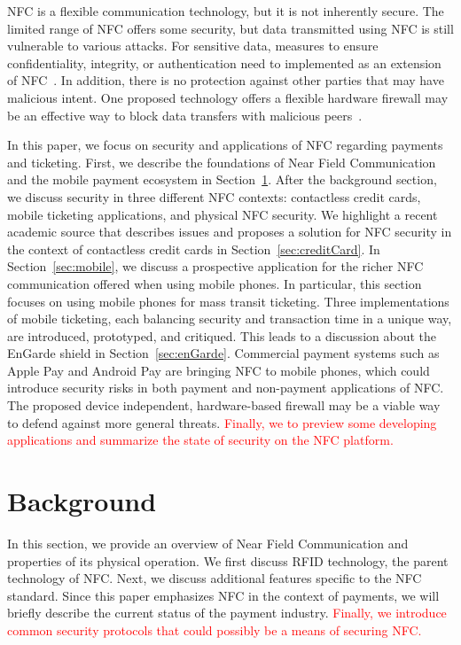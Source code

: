 \documentclass{sig-alternate}
\begin{document}
NFC is a flexible communication technology, but it is not inherently secure. The limited range of NFC offers some security, but data transmitted using NFC is still vulnerable to various attacks. For sensitive data, measures to ensure confidentiality, integrity, or authentication need to implemented as an extension of NFC~\cite{CC2016}. In addition, there is no protection against other parties that may have malicious intent. One proposed technology offers a flexible hardware firewall may be an effective way to block data transfers with malicious peers~\cite{Gum2013}.

In this paper, we focus on security and applications of NFC regarding payments and ticketing. First, we describe the foundations of Near Field Communication and the mobile payment ecosystem in Section~\ref{sec:background}. After the background section, we discuss security in three different NFC contexts: contactless credit cards, mobile ticketing applications, and physical NFC security. 
We highlight a recent academic source that describes issues and proposes a solution for NFC security in the context of contactless credit cards in Section~\ref{sec:creditCard}. 
In Section~\ref{sec:mobile}, we discuss a prospective application for the richer NFC communication offered when using mobile phones. In particular, this section focuses on  using mobile phones for mass transit ticketing. Three implementations of mobile ticketing, each balancing security and transaction time in a unique way, are introduced, prototyped, and critiqued.
This leads to a discussion about the EnGarde shield in Section~\ref{sec:enGarde}. Commercial payment systems such as Apple Pay and Android Pay are bringing NFC to mobile phones, which could introduce security risks in both payment and non-payment applications of NFC. The proposed device independent, hardware-based firewall may be a viable way to defend against more general threats. \textcolor{red}{Finally, we to preview some developing applications and summarize the state of security on the NFC platform.}


\section{Background}
\label{sec:background}
In this section, we provide an overview of Near Field Communication and properties of its physical operation.  We first discuss RFID technology, the parent technology of NFC. Next, we discuss additional features specific to the NFC standard. Since this paper emphasizes NFC in the context of payments, we will briefly describe the current status of the payment industry. \textcolor{red}{Finally, we introduce common security protocols that could possibly be a means of securing NFC.}
\end{document}
